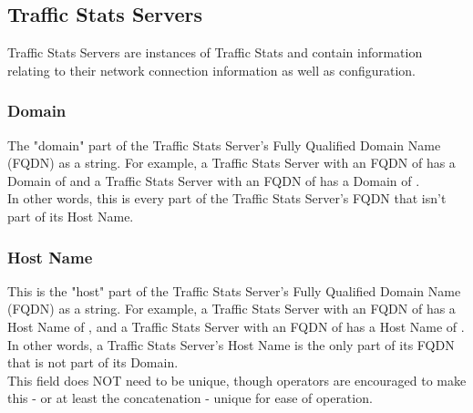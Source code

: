 %
%

\subsection{Traffic Stats Servers}
Traffic Stats Servers are instances of Traffic Stats and contain information
relating to their network connection information as well as configuration.

\subsubsection{Domain}
The "domain" part of the Traffic Stats Server's Fully Qualified Domain Name
(FQDN) as a string. For example, a Traffic Stats Server with an FQDN of
 has a Domain of  and a Traffic Stats Server with an
FQDN of  has a Domain of .\\
In other words, this is every part of the Traffic Stats Server's FQDN that
isn't part of its Host Name.

\subsubsection{Host Name}
This is the "host" part of the Traffic Stats Server's Fully Qualified Domain
Name (FQDN) as a string. For example, a Traffic Stats Server with an FQDN of
 has a Host Name of , and a Traffic Stats Server
with an FQDN of  has a Host Name of
.\\
In other words, a Traffic Stats Server's Host Name is the only part of its FQDN
that is not part of its Domain.\\
This field does NOT need to be unique, though operators are encouraged to make
this - or at least the concatenation  -
unique for ease of operation.

